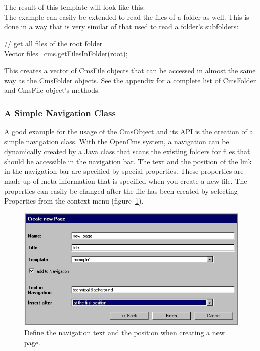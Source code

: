 The result of this template will look like this:\\


The example can easily be extended to read the files of a folder as
well. This is done in a way that is very similar of that used to read a
folder's subfolders:

\begin{java}
// get all files of the root folder\\
Vector files=cms.getFilesInFolder(root);\\
\end{java}

This creates a vector of CmsFile objects that can be accessed in almost
the same way as the CmsFolder objects. See the appendix for a complete
list of CmsFolder and CmsFile object's methods.

\subsubsection{A Simple Navigation Class}
A good example for the usage of the CmsObject and its API is the
creation of a simple navigation class. With the OpenCms system, a
navigation can be dynamically created by a Java class that scans the
existing folders for files that should be accessible in the navigation
bar. The text and the position of the link in the navigation bar are
specified by special properties. These properties are made up of
meta-information that is specified when you create a new file. The
properties can easily be changed after the file has been created by
selecting Properties from the context menu (figure~\ref{NavText}).

\begin{figure}
\begin{center}
\includegraphics[clip,width=\sgw]{pics/modules/33}
\end{center}
\caption[Define the nav text]{Define the navigation text and the position 
when creating a new page.}
\label{NavText}
\end{figure}

